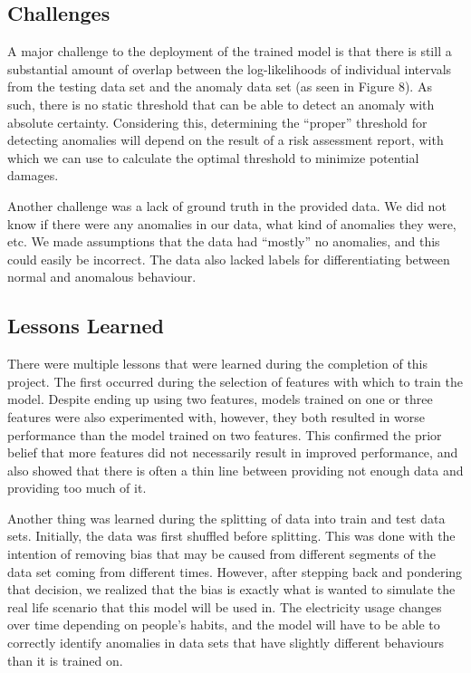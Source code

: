 \documentclass[11pt]{article}
\begin{document}
\subsection{Challenges}
A major challenge to the deployment of the trained model is that there is still a substantial
amount of overlap between the log-likelihoods of individual intervals from the testing data set and
the anomaly data set (as seen in Figure 8).
As such, there is no static threshold that can be able to detect an anomaly with absolute
certainty.
Considering this, determining the ``proper'' threshold for detecting anomalies will depend on the
result of a risk assessment report, with which we can use to calculate the optimal threshold to
minimize potential damages.

Another challenge was a lack of ground truth in the provided data. 
We did not know if there were any anomalies in our data, what kind of anomalies they were, etc. 
We made assumptions that the data had ``mostly'' no anomalies, and this could easily be incorrect.
The data also lacked labels for differentiating between normal and anomalous behaviour.

\subsection{Lessons Learned}
There were multiple lessons that were learned during the completion of this project.
The first occurred during the selection of features with which to train the model.
Despite ending up using two features, models trained on one or three features were also
experimented with, however, they both resulted in worse performance than the model trained on two
features.
This confirmed the prior belief that more features did not necessarily result in improved
performance, and also showed that there is often a thin line between providing not enough data and
providing too much of it.

Another thing was learned during the splitting of data into train and test data sets.
Initially, the data was first shuffled before splitting.
This was done with the intention of removing bias that may be caused from different segments of the
data set coming from different times.
However, after stepping back and pondering that decision, we realized that the bias is exactly what
is wanted to simulate the real life scenario that this model will be used in.
The electricity usage changes over time depending on people's habits, and the model will have to be
able to correctly identify anomalies in data sets that have slightly different behaviours than it
is trained on.
\end{document}
